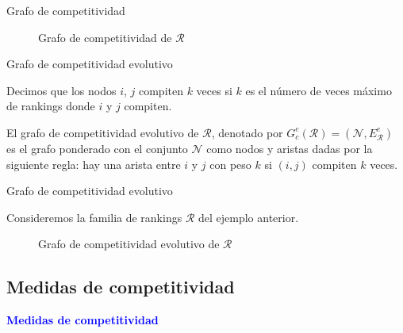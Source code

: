 \documentclass[10pt]{beamer}
\begin{document}
	\begin{frame}{Grafo de competitividad}
		\begin{ejemplo}[continuación]
			\begin{figure}
				\centering
				\ejemplografocompetitividad
				\caption{Grafo de competitividad de $\mathcal{R}$}
				\label{fig:grafo_competitividad}
			\end{figure}	
		\end{ejemplo}
	\end{frame}
	
	\begin{frame}{Grafo de competitividad evolutivo}
		\begin{defi}
			Decimos que los nodos $i$, $j$ compiten $k$ veces si $k$ es el número de veces máximo de rankings donde $i$ y $j$ compiten.
		\end{defi}
		
		\begin{defi}
			El grafo de competitividad evolutivo de $\mathcal{R}$, denotado por $G_c^e(\mathcal{R}) = (\mathcal{N}, E_\mathcal{R}^e)$ es el grafo ponderado con el conjunto $\mathcal{N}$ como nodos y aristas dadas por la siguiente regla: hay una arista entre $i$ y $j$ con peso $k$ si $(i,j)$ compiten $k$ veces.
		\end{defi}
	\end{frame}
	
	\begin{frame}{Grafo de competitividad evolutivo}
		\begin{ejemplo}
			Consideremos la familia de rankings $\mathcal{R}$ del ejemplo anterior.
			
			\begin{figure}
				\centering
				\resizebox{!}{0.5\textheight}{\ejemplografocompetitividadevolutivo}
				
				\caption{Grafo de competitividad evolutivo de $\mathcal{R}$}
				\label{fig:grafo_competitividad_evolutivo}
			\end{figure}
			
		\end{ejemplo}
	\end{frame}
	
	\subsection{Medidas de competitividad}
	
	\begin{frame}
		\begin{center}
			\Huge\textbf{\textsf{\textcolor{blue}{Medidas de competitividad}}}
		\end{center}
	\end{frame}
	
\end{document}
